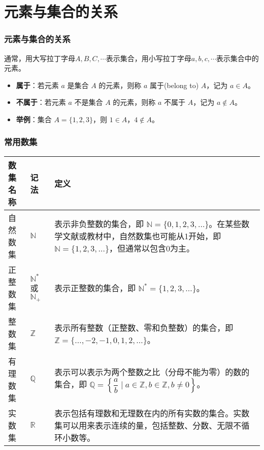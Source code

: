 \documentclass[aspectratio=169]{ctexbeamer} %
\begin{document}
\section{元素与集合的关系}
\begin{frame}
\frametitle{元素与集合的关系}
通常，用大写拉丁字母\(A, B, C, \cdots \)表示集合，用小写拉丁字母\(a, b, c, \cdots \)表示集合中的元素。\\
\begin{itemize}
\item \textbf{属于}：若元素 \(a\) 是集合 \(A\) 的元素，则称 \(a\) \alert{属于}(belong to) \(A\)，记为 \(a \in A\)。\\
\item \textbf{不属于}：若元素 \(a\) 不是集合 \(A\) 的元素，则称 \(a\) \alert{不属于} \(A\)，记为 \(a \notin A\)。\\
\item \textbf{举例}：集合 \(A = \{1, 2, 3\}\)，则 \(1 \in A\)，\(4 \notin A\)。
\end{itemize}
\end{frame}

\begin{frame}
\frametitle{常用数集}
\begin{table}[h]
\centering
\begin{tabular}{|m{5cm}|m{5cm}|m{20cm}|}
\hline
\textbf{数集名称} & \textbf{记法} & \textbf{定义} \\ \hline
自然数集 & $\mathbb{N}$ & 表示非负整数的集合，即 $\mathbb{N} = \{0, 1, 2, 3, \ldots\}$。在某些数学文献或教材中，自然数集也可能从1开始，即 $\mathbb{N} = \{1, 2, 3, \ldots\}$，但通常以包含0为主。 \\ \hline
正整数集 & $\mathbb{N}^*$ 或 $\mathbb{N}_+$ & 表示正整数的集合，即 $\mathbb{N}^* = \{1, 2, 3, \ldots\}$。 \\ \hline
整数集 & $\mathbb{Z}$ & 表示所有整数（正整数、零和负整数）的集合，即 $\mathbb{Z} = \{\ldots, -2, -1, 0, 1, 2, \ldots\}$。 \\ \hline
有理数集 & $\mathbb{Q}$ & 表示可以表示为两个整数之比（分母不能为零）的数的集合，即 $\mathbb{Q} = \left\{ \dfrac{a}{b} \mid a \in \mathbb{Z}, b \in \mathbb{Z}, b \neq 0 \right\}$。 \\ \hline
实数集 & $\mathbb{R}$ & 表示包括有理数和无理数在内的所有实数的集合。实数集可以用来表示连续的量，包括整数、分数、无限不循环小数等。 \\ \hline
\end{tabular}
\end{table}

\end{frame}
\end{document}

